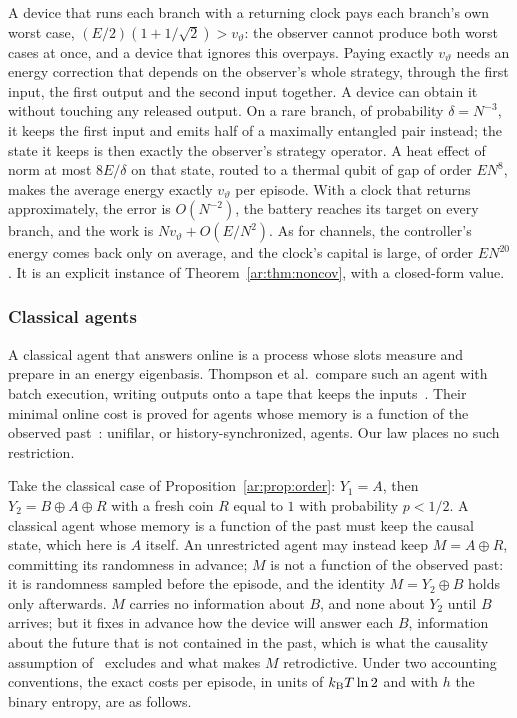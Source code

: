 A device that runs each branch with a returning clock pays each branch's own worst case, $(E/2)(1+1/\sqrt2)>v_\vartheta$: the observer cannot produce both worst cases at once, and a device that ignores this overpays. Paying exactly $v_\vartheta$ needs an energy correction that depends on the observer's whole strategy, through the first input, the first output and the second input together. A device can obtain it without touching any released output. On a rare branch, of probability $\delta=N^{-3}$, it keeps the first input and emits half of a maximally entangled pair instead; the state it keeps is then exactly the observer's strategy operator. A heat effect of norm at most $8E/\delta$ on that state, routed to a thermal qubit of gap of order $EN^8$, makes the average energy exactly $v_\vartheta$ per episode. With a clock that returns approximately, the error is $O(N^{-2})$, the battery reaches its target on every branch, and the work is $Nv_\vartheta+O(E/N^2)$. As for channels, the controller's energy comes back only on average, and the clock's capital is large, of order $EN^{20}$. It is an explicit instance of Theorem~\ref{ar:thm:noncov}, with a closed-form value.

\subsubsection{Classical agents}

A classical agent that answers online is a process whose slots measure and prepare in an energy eigenbasis. Thompson et al.\ compare such an agent with batch execution, writing outputs onto a tape that keeps the inputs~\cite{Thompson25}. Their minimal online cost is proved for agents whose memory is a function of the observed past~\cite{Thompson25}: unifilar, or history-synchronized, agents. Our law places no such restriction.

Take the classical case of Proposition~\ref{ar:prop:order}: $Y_1=A$, then $Y_2=B\oplus A\oplus R$ with a fresh coin $R$ equal to $1$ with probability $p<1/2$. A classical agent whose memory is a function of the past must keep the causal state, which here is $A$ itself. An unrestricted agent may instead keep $M=A\oplus R$, committing its randomness in advance; $M$ is not a function of the observed past: it is randomness sampled before the episode, and the identity $M=Y_2\oplus B$ holds only afterwards. $M$ carries no information about $B$, and none about $Y_2$ until $B$ arrives; but it fixes in advance how the device will answer each $B$, information about the future that is not contained in the past, which is what the causality assumption of~\cite{Thompson25} excludes and what makes $M$ retrodictive. Under two accounting conventions, the exact costs per episode, in units of $k_{\mathrm B} T\ln2$ and with $h$ the binary entropy, are as follows.

